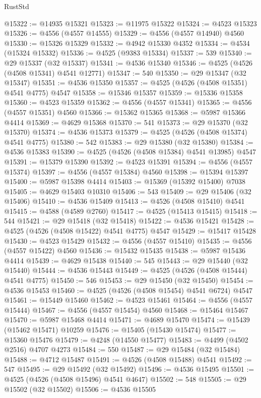 \begin{lexlean}{RustStd}
\begin{coremodule}
@15322 := @14935 @15321
@15323 := @11975 @15322
@15324 := @4523 @15323
@15326 := @4556 (@4557 @14555)
@15329 := @4556 (@4557 @14940) @4560
@15330 := @15326 @15329
@15332 := @4942 @15330 @4352
@15334 := @4534 (@15324 @15332)
@15336 := @4525 (@9383 @15334)
@15337 := 539
@15340 := @29 @15337 (@32 @15337)
@15341 := @4536 @15340
@15346 := @4525 (@4526 (@4508 @15341) @4541 @12771)
@15347 := 540
@15350 := @29 @15347 (@32 @15347)
@15351 := @4536 @15350
@15357 := @4525 (@4526 (@4508 @15351) @4541 @4775) @4547
@15358 := @15346 @15357
@15359 := @15336 @15358
@15360 := @4523 @15359
@15362 := @4556 (@4557 @15341)
@15365 := @4556 (@4557 @15351) @4560
@15366 := @15362 @15365
@15368 := @5987 @15366 @4414
@15369 := @4629 @15368
@15370 := 541
@15373 := @29 @15370 (@32 @15370)
@15374 := @4536 @15373
@15379 := @4525 (@4526 (@4508 @15374) @4541 @4775)
@15380 := 542
@15383 := @29 @15380 (@32 @15380)
@15384 := @4536 @15383
@15390 := @4525 (@4526 (@4508 @15384) @4541 @13985) @4547
@15391 := @15379 @15390
@15392 := @4523 @15391
@15394 := @4556 (@4557 @15374)
@15397 := @4556 (@4557 @15384) @4560
@15398 := @15394 @15397
@15400 := @5987 @15398 @4414
@15403 := @15369 (@15392 @15400) @7038
@15405 := @4629 @15403 @10310
@15406 := 543
@15409 := @29 @15406 (@32 @15406)
@15410 := @4536 @15409
@15413 := @4526 (@4508 @15410) @4541
@15415 := @4588 (@4589 @2760)
@15417 := @4525 (@15413 @15415)
@15418 := 544
@15421 := @29 @15418 (@32 @15418)
@15422 := @4536 @15421
@15428 := @4525 (@4526 (@4508 @15422) @4541 @4775) @4547
@15429 := @15417 @15428
@15430 := @4523 @15429
@15432 := @4556 (@4557 @15410)
@15435 := @4556 (@4557 @15422) @4560
@15436 := @15432 @15435
@15438 := @5987 @15436 @4414
@15439 := @4629 @15438
@15440 := 545
@15443 := @29 @15440 (@32 @15440)
@15444 := @4536 @15443
@15449 := @4525 (@4526 (@4508 @15444) @4541 @4775)
@15450 := 546
@15453 := @29 @15450 (@32 @15450)
@15454 := @4536 @15453
@15460 := @4525 (@4526 (@4508 @15454) @4541 @6724) @4547
@15461 := @15449 @15460
@15462 := @4523 @15461
@15464 := @4556 (@4557 @15444)
@15467 := @4556 (@4557 @15454) @4560
@15468 := @15464 @15467
@15470 := @5987 @15468 @4414
@15471 := @4689 @15470
@15474 := @15439 (@15462 @15471) @10259
@15476 := @15405 (@15430 @15474)
@15477 := @15360 @15476
@15479 := @4248 (@14550 @15477)
@15483 := @4499 (@4502 @2516) @4707 @4273
@15484 := 550
@15487 := @29 @15484 (@32 @15484)
@15488 := @4712 @15487
@15491 := @4526 (@4508 @15488) @4541
@15492 := 547
@15495 := @29 @15492 (@32 @15492)
@15496 := @4536 @15495
@15501 := @4525 (@4526 (@4508 @15496) @4541 @4647)
@15502 := 548
@15505 := @29 @15502 (@32 @15502)
@15506 := @4536 @15505

\end{coremodule}
\end{lexlean}
